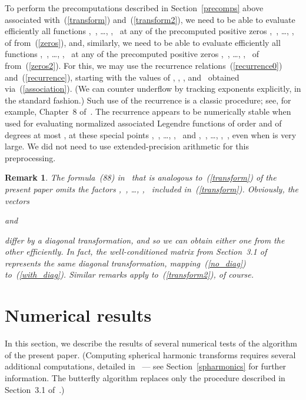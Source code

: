 \documentclass[final,3p,times]{elsarticle}
\newtheorem{remark1}[theorem]{Remark}
\newenvironment{remark}{\begin{remark1}\rm}{\end{remark1}}
\begin{document}
To perform the precomputations described in Section~\ref{precomps} above
associated with~(\ref{transform}) and~(\ref{transform2}),
we need to be able to evaluate efficiently all  functions
,~, \dots,
,~
at any of the precomputed positive zeros
,~, \dots, ,~ 
of  from~(\ref{zeros}),
and, similarly, we need to be able to evaluate efficiently all  functions
,~, \dots,
,~
at any of the precomputed positive zeros
,~, \dots, ,~ 
of  from~(\ref{zeros2}).
For this, we may use the recurrence relations~(\ref{recurrence0})
and~(\ref{recurrence}), starting with the values of ,
, ,
and~ obtained via~(\ref{association}).
(We can counter underflow by tracking exponents explicitly,
in the standard fashion.)
Such use of the recurrence is a classic procedure;
see, for example, Chapter~8 of~\cite{abramowitz-stegun}.
The recurrence appears to be numerically stable when used
for evaluating normalized associated Legendre functions of order 
and of degrees at most ,
at these special points ,~, \dots, ,~ 
and ,~, \dots, ,~, even when  is very large.
We did not need to use extended-precision arithmetic for this preprocessing.

\begin{remark}
\label{omission}
The formula~(88) in~\cite{tygert_sph} that is analogous to~(\ref{transform})
of the present paper omits the factors ,~, \dots,
,~ included in~(\ref{transform}).
Obviously, the vectors

and

differ by a diagonal transformation, and so we can obtain either one
from the other efficiently.
In fact, the well-conditioned matrix  from Section~3.1 of~\cite{tygert_sph}
represents the same diagonal transformation,
mapping~(\ref{no_diag}) to~(\ref{with_diag}).
Similar remarks apply to~(\ref{transform2}), of course.
\end{remark}



\section{Numerical results}
\label{numerical}

In this section, we describe the results of several numerical tests
of the algorithm of the present paper.
(Computing spherical harmonic transforms requires
several additional computations, detailed in~\cite{tygert_sph}
--- see Section~\ref{spharmonics} for further information.
The butterfly algorithm replaces only the procedure described
in Section~3.1 of~\cite{tygert_sph}.)
\end{document}
